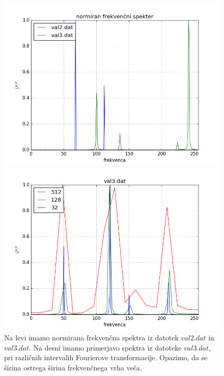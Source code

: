 \documentclass[slovene,11pt,a4paper]{article}
\numberwithin{equation}{section} %
\numberwithin{figure}{section} %
\numberwithin{table}{section} %
\begin{document}
\begin{figure}[h]
\centering
\begin{minipage}{0.5\textwidth}
\centering
\includegraphics[scale=0.4]{slike/prva_naloga_1.png}
\end{minipage}\hfill
\begin{minipage}{0.5\textwidth}
\centering
\includegraphics[scale=0.4]{slike/prva_naloga_2.png}
\end{minipage}
\caption{Na levi imamo normirana frekvenčna spektra iz datotek $val2.dat$ in $val3.dat$. Na desni imamo primerjavo spektra iz datoteke $val3.dat$, pri različnih intervalih Fourierove transformacije. Opazimo, da se širina ostrega širina frekvenčnega vrha veča. }
\end{figure}
\end{document}
